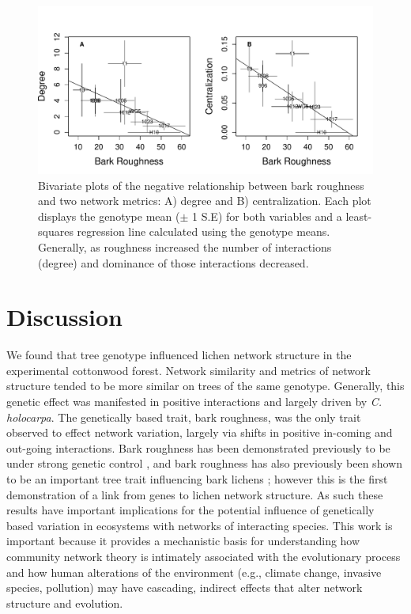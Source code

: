 \documentclass[fleqn,12pt]{olplainarticle}
\begin{document}
\begin{figure}[ht]
\centering
\includegraphics[width=\linewidth]{br_net.pdf}
\caption{Bivariate plots of the negative relationship between bark
  roughness and two network metrics: A) degree and B)
  centralization. Each plot displays the genotype mean ($\pm$ 1 S.E)
  for both variables and a least-squares regression line calculated
  using the genotype means. Generally, as roughness increased the
  number of interactions (degree) and dominance of
  those interactions decreased.}
\label{fig:br_net}
\end{figure}


\section*{Discussion}

We found that tree genotype influenced lichen network structure in the
experimental cottonwood forest. Network similarity and metrics of
network structure tended to be more similar on trees of the same
genotype. Generally, this genetic effect was manifested in positive
interactions and largely driven by \textit{C. holocarpa}. The
genetically based trait, bark roughness, was the only trait observed
to effect network variation, largely via shifts in positive in-coming
and out-going interactions. Bark roughness has been demonstrated
previously to be under strong genetic control \cite{Bdeir2017}, and
bark roughness has also previously been shown to be an important tree
trait influencing bark lichens \cite{Lamit2015a}; however this is the
first demonstration of a link from genes to lichen network structure.
As such these results have important implications for the potential
influence of genetically based variation in ecosystems with networks
of interacting species. This work is important because it provides a
mechanistic basis for understanding how community network theory is
intimately associated with the evolutionary process and how human
alterations of the environment (e.g., climate change, invasive
species, pollution) may have cascading, indirect effects that alter
network structure and evolution.
\end{document}
